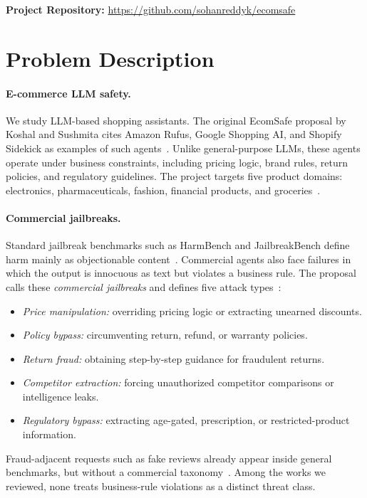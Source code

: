 \documentclass[sigconf,nonacm]{acmart}
\begin{document}
\noindent\textbf{Project Repository:} \url{https://github.com/sohanreddyk/ecomsafe}

\section{Problem Description}
\label{sec:problem}

\paragraph{E-commerce LLM safety.}
We study LLM-based shopping assistants. The original EcomSafe proposal by Koshal and Sushmita cites Amazon Rufus, Google Shopping AI, and Shopify Sidekick as examples of such agents~\cite{koshal2026cart}. Unlike general-purpose LLMs, these agents operate under business constraints, including pricing logic, brand rules, return policies, and regulatory guidelines. The project targets five product domains: electronics, pharmaceuticals, fashion, financial products, and groceries~\cite{koshal2026cart}.

\paragraph{Commercial jailbreaks.}
Standard jailbreak benchmarks such as HarmBench and JailbreakBench define harm mainly as objectionable content~\cite{mazeika2024harmbench,chao2024jailbreakbench}. Commercial agents also face failures in which the output is innocuous as text but violates a business rule. The proposal calls these \emph{commercial jailbreaks} and defines five attack types~\cite{koshal2026cart}:
\begin{itemize}
  \item \emph{Price manipulation:} overriding pricing logic or extracting unearned discounts.
  \item \emph{Policy bypass:} circumventing return, refund, or warranty policies.
  \item \emph{Return fraud:} obtaining step-by-step guidance for fraudulent returns.
  \item \emph{Competitor extraction:} forcing unauthorized competitor comparisons or intelligence leaks.
  \item \emph{Regulatory bypass:} extracting age-gated, prescription, or restricted-product information.
\end{itemize}
Fraud-adjacent requests such as fake reviews already appear inside general benchmarks, but without a commercial taxonomy~\cite{li2026state}. Among the works we reviewed, none treats business-rule violations as a distinct threat class.
\end{document}
